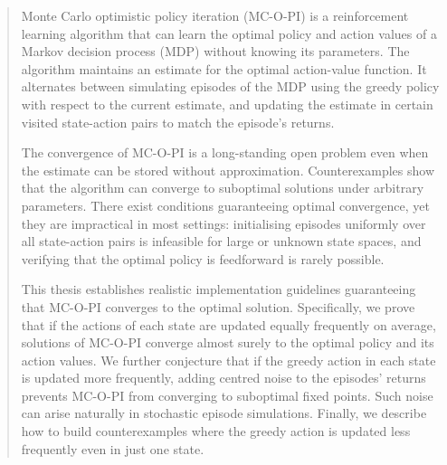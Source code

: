 \begin{abstract}


Monte Carlo optimistic policy iteration (MC-O-PI) is a
reinforcement learning algorithm that can learn the optimal policy and action values of a Markov decision process (MDP) without knowing its parameters.
The algorithm maintains an estimate for the optimal action-value function. It alternates between simulating episodes of the MDP using the greedy policy with respect to the current estimate, and updating the estimate in certain visited state-action pairs to match the episode's returns.



The convergence of MC-O-PI is a long-standing open problem even 
when the estimate can be stored without approximation.
Counterexamples show that the algorithm can converge to suboptimal solutions under arbitrary parameters.
There exist conditions guaranteeing optimal convergence,
yet they are impractical in most settings:
initialising episodes uniformly
over all state-action pairs is infeasible for large or unknown state spaces, and verifying that the optimal policy is feedforward is rarely possible.


This thesis establishes realistic implementation guidelines guaranteeing that MC-O-PI converges to the optimal solution.
Specifically, we prove that if the actions of each state are updated equally frequently on average, solutions of MC-O-PI converge almost surely to the optimal policy and its action values.
We further conjecture that if the greedy action in each state is updated more frequently, adding centred noise to the episodes' returns prevents MC-O-PI 
from converging to suboptimal fixed points.
Such noise can arise naturally in stochastic episode simulations.
Finally, we describe how to build counterexamples where the greedy action is updated less frequently even in just one state.



\end{abstract}
